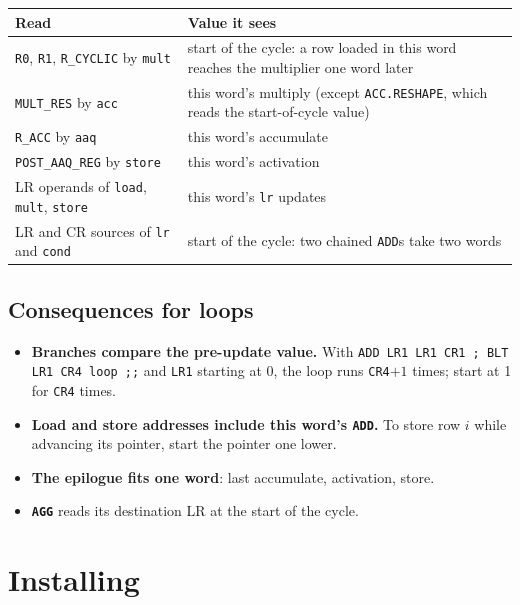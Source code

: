 \documentclass[11pt,a4paper]{article}
\begin{document}
\begin{center}
\small
\begin{tabularx}{\linewidth}{lX}
\toprule
Read & Value it sees \\
\midrule
\texttt{R0}, \texttt{R1}, \texttt{R\_CYCLIC} by \texttt{mult} & start of the
cycle: a row loaded in this word reaches the multiplier one word later \\
\texttt{MULT\_RES} by \texttt{acc} & this word's multiply (except
\texttt{ACC.RESHAPE}, which reads the start-of-cycle value) \\
\texttt{R\_ACC} by \texttt{aaq} & this word's accumulate \\
\texttt{POST\_AAQ\_REG} by \texttt{store} & this word's activation \\
LR operands of \texttt{load}, \texttt{mult}, \texttt{store} & this
word's \texttt{lr} updates \\
LR and CR sources of \texttt{lr} and \texttt{cond} & start of the cycle: two
chained \texttt{ADD}s take two words \\
\bottomrule
\end{tabularx}
\end{center}

\subsection{Consequences for loops}

\begin{itemize}
\item \textbf{Branches compare the pre-update value.} With
  \texttt{ADD LR1 LR1 CR1 ; BLT LR1 CR4 loop ;;} and \texttt{LR1} starting at 0,
  the loop runs \texttt{CR4}$+1$ times; start at 1 for \texttt{CR4} times.
\item \textbf{Load and store addresses include this word's \texttt{ADD}.} To
  store row $i$ while advancing its pointer, start the pointer one lower.
\item \textbf{The epilogue fits one word}: last accumulate, activation, store.
\item \textbf{\texttt{AGG}} reads its destination LR at the start of the
  cycle.
\end{itemize}

\section{Installing}
\end{document}
